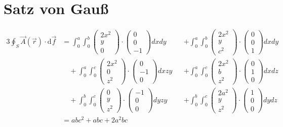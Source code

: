 \documentclass[sectionformat=aufgabe]{gadsescript}
\newcommand{\dd}{\text{d}}
\begin{document}
\section{Satz von Gauß}

\begin{alignat*}{3}
	\oint_{S}^{} \vec A ( \vec r ) \cdot \dd \vec f &= %
	\int_{0}^{a} \int_{0}^{b} \begin{pmatrix} 2x^2 \\ y \\ 0 \end{pmatrix} \cdot \begin{pmatrix} 0 \\ 0 \\ -1 \end{pmatrix} dx dy %
	&&+ \int_{0}^{a} \int_{0}^{b} \begin{pmatrix} 2x^2 \\ y \\ c^2 \end{pmatrix} \cdot \begin{pmatrix} 0 \\ 0 \\ 1 \end{pmatrix} dx dy \\
	& \quad + \int_{0}^{a} \int_{0}^{c} \begin{pmatrix} 2x^2 \\ 0 \\ z^2 \end{pmatrix} \cdot \begin{pmatrix} 0 \\ -1 \\ 0 \end{pmatrix} dx zy %
	&&+ \int_{0}^{a} \int_{0}^{c} \begin{pmatrix} 2x^2 \\ b \\ z^2 \end{pmatrix} \cdot \begin{pmatrix} 0 \\ 1 \\ 0 \end{pmatrix} dx dz \\
	& \quad + \int_{0}^{b} \int_{0}^{c} \begin{pmatrix} 0 \\ y \\ z^2 \end{pmatrix} \cdot \begin{pmatrix} -1 \\ 0 \\ 0 \end{pmatrix} dy zy %
	&&+ \int_{0}^{b} \int_{0}^{c} \begin{pmatrix} 2a^2 \\ y \\ z^2 \end{pmatrix} \cdot \begin{pmatrix} 1 \\ 0 \\ 0 \end{pmatrix} dy dz \\
	&= abc^2 + abc + 2a^2bc
\end{alignat*}
\end{document}
